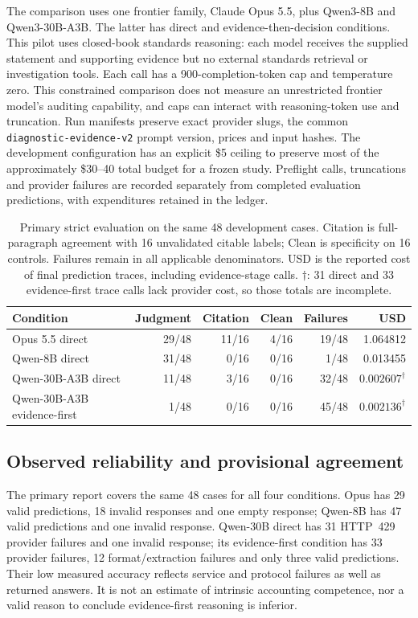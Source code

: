 \documentclass[11pt]{article}
\begin{document}
The comparison uses one frontier family, Claude Opus 5.5, plus Qwen3-8B and Qwen3-30B-A3B. The latter has direct and evidence-then-decision conditions. This pilot uses closed-book standards reasoning: each model receives the supplied statement and supporting evidence but no external standards retrieval or investigation tools. Each call has a 900-completion-token cap and temperature zero. This constrained comparison does not measure an unrestricted frontier model's auditing capability, and caps can interact with reasoning-token use and truncation. Run manifests preserve exact provider slugs, the common \texttt{diagnostic-evidence-v2} prompt version, prices and input hashes. The development configuration has an explicit \$5 ceiling to preserve most of the approximately \$30--40 total budget for a frozen study. Preflight calls, truncations and provider failures are recorded separately from completed evaluation predictions, with expenditures retained in the ledger.

\begin{table}[t]
\centering\small
\begin{tabularx}{\linewidth}{Xrrrrr}
\toprule
Condition & Judgment & Citation & Clean & Failures & USD\\
\midrule
Opus 5.5 direct & 29/48 & 11/16 & 4/16 & 19/48 & 1.064812\\
Qwen-8B direct & 31/48 & 0/16 & 0/16 & 1/48 & 0.013455\\
Qwen-30B-A3B direct & 11/48 & 3/16 & 0/16 & 32/48 & $0.002607^{\dagger}$\\
Qwen-30B-A3B evidence-first & 1/48 & 0/16 & 0/16 & 45/48 & $0.002136^{\dagger}$\\
\bottomrule
\end{tabularx}
\caption{Primary strict evaluation on the same 48 development cases. Citation is full-paragraph agreement with 16 unvalidated citable labels; Clean is specificity on 16 controls. Failures remain in all applicable denominators. USD is the reported cost of final prediction traces, including evidence-stage calls. $\dagger$: 31 direct and 33 evidence-first trace calls lack provider cost, so those totals are incomplete.}
\label{tab:pilot}
\end{table}

\subsection{Observed reliability and provisional agreement}
The primary report covers the same 48 cases for all four conditions. Opus has 29 valid predictions, 18 invalid responses and one empty response; Qwen-8B has 47 valid predictions and one invalid response. Qwen-30B direct has 31 HTTP~429 provider failures and one invalid response; its evidence-first condition has 33 provider failures, 12 format/extraction failures and only three valid predictions. Their low measured accuracy reflects service and protocol failures as well as returned answers. It is not an estimate of intrinsic accounting competence, nor a valid reason to conclude evidence-first reasoning is inferior.
\end{document}
